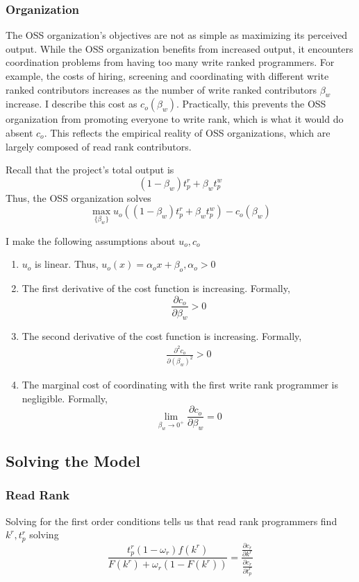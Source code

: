 \documentclass[source/paper/main.tex]{subfiles}
\begin{document}
\subsubsection{Organization}
The OSS organization's objectives are not as simple as maximizing its perceived output. While the OSS organization benefits from increased output, it encounters coordination problems from having too many write ranked programmers. For example, the costs of hiring, screening and coordinating with different write ranked contributors increases as the number of write ranked contributors $\beta_w$ increase. I describe this cost as $c_o(\beta_w)$. Practically, this prevents the OSS organization from promoting everyone to write rank, which is what it would do absent $c_o$. This reflects the empirical reality of OSS organizations, which are largely composed of read rank contributors. 


\qquad Recall that the project's total output is 
$$(1-\beta_w) t_p^r + \beta_w t_p^w$$
Thus, the OSS organization solves
$$\max_{\{\beta_w\}} u_o\left((1-\beta_w) t_p^r + \beta_w t_p^w\right) - c_o(\beta_w)$$ 

I make the following assumptions about $u_o, c_o$
\begin{enumerate}
    \item $u_o$ is linear. Thus, $u_o(x) = \alpha_ox + \beta_o, \alpha_o > 0$
    \item The first derivative of the cost function is increasing. Formally, 
    $$\frac{\partial c_o}{\partial \beta_w}>0$$
    \item  The second derivative of the cost function is increasing. Formally, 
    \begin{align}
        \frac{\partial^2 c_o}{\partial (\beta_w)^2}>0 \label{org_concave_cost}
    \end{align}
    \item The marginal cost of coordinating with the first write rank programmer is negligible. Formally,
    $$\lim_{\beta_w \to 0^+} \frac{\partial c_o}{\partial \beta_w} = 0 $$
\end{enumerate}

\subsection{Solving the Model}
\subsubsection{Read Rank}
Solving for the first order conditions tells us that read rank programmers find $k^r, t_p^r$ solving 
$$\frac{t_p^r(1-\omega_r)f(k^r)}{F(k^r) + \omega_r(1-F(k^r)) } = \frac{\frac{\partial c_r}{\partial k^r}}{\frac{\partial c_r}{\partial t_p^r}}$$
\end{document}
